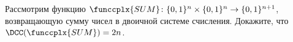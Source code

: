 Рассмотрим функцию $\funccplx{SUM}\colon \{0, 1\}^n \times \{0, 1\}^n \to \{0, 1\}^{n + 1}$, возвращающую
сумму чисел в двоичной системе счисления. Докажите, что $\DCC(\funccplx{SUM}) = 2n$.